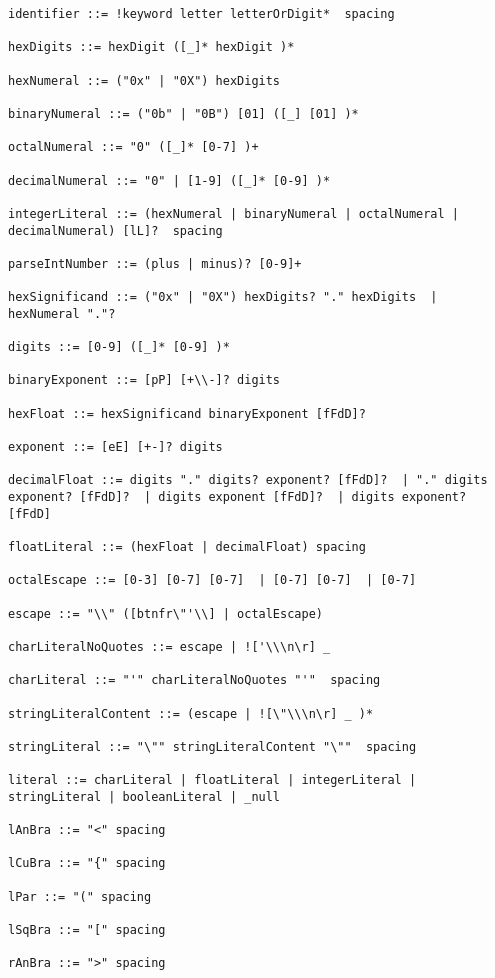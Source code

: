 \begin{lstlisting}[breaklines=true]
identifier ::= !keyword letter letterOrDigit*  spacing

hexDigits ::= hexDigit ([_]* hexDigit )*

hexNumeral ::= ("0x" | "0X") hexDigits

binaryNumeral ::= ("0b" | "0B") [01] ([_] [01] )*

octalNumeral ::= "0" ([_]* [0-7] )+

decimalNumeral ::= "0" | [1-9] ([_]* [0-9] )*

integerLiteral ::= (hexNumeral | binaryNumeral | octalNumeral | decimalNumeral) [lL]?  spacing

parseIntNumber ::= (plus | minus)? [0-9]+

hexSignificand ::= ("0x" | "0X") hexDigits? "." hexDigits  | hexNumeral "."?

digits ::= [0-9] ([_]* [0-9] )*

binaryExponent ::= [pP] [+\\-]? digits

hexFloat ::= hexSignificand binaryExponent [fFdD]?

exponent ::= [eE] [+-]? digits

decimalFloat ::= digits "." digits? exponent? [fFdD]?  | "." digits exponent? [fFdD]?  | digits exponent [fFdD]?  | digits exponent? [fFdD]

floatLiteral ::= (hexFloat | decimalFloat) spacing

octalEscape ::= [0-3] [0-7] [0-7]  | [0-7] [0-7]  | [0-7]

escape ::= "\\" ([btnfr\"'\\] | octalEscape)

charLiteralNoQuotes ::= escape | !['\\\n\r] _

charLiteral ::= "'" charLiteralNoQuotes "'"  spacing

stringLiteralContent ::= (escape | ![\"\\\n\r] _ )*

stringLiteral ::= "\"" stringLiteralContent "\""  spacing

literal ::= charLiteral | floatLiteral | integerLiteral | stringLiteral | booleanLiteral | _null

lAnBra ::= "<" spacing

lCuBra ::= "{" spacing

lPar ::= "(" spacing

lSqBra ::= "[" spacing

rAnBra ::= ">" spacing


\end{lstlisting}
